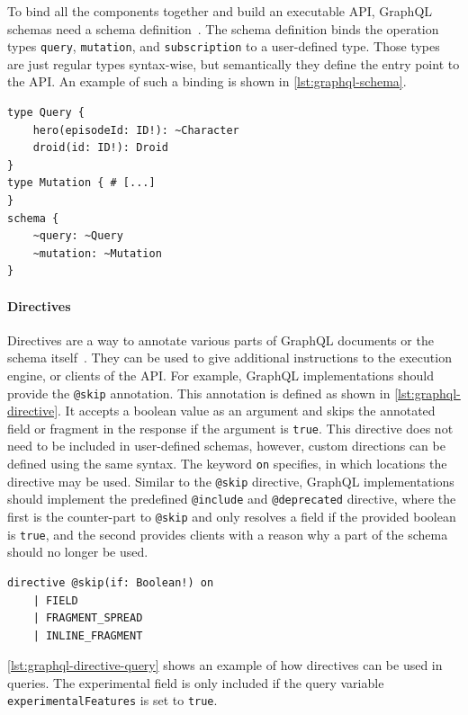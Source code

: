 To bind all the components together and build an executable \ac{API}, GraphQL schemas need a schema definition~\cite{Facebook2018}.
The schema definition binds the operation types \texttt{query}, \texttt{mutation}, and \texttt{subscription} to a user-defined type.
Those types are just regular types syntax-wise, but semantically they define the entry point to the \ac{API}.
An example of such a binding is shown in \autoref{lst:graphql-schema}.

\begin{lstlisting}[caption={Query and Mutation Types}, language=graphqls, label={lst:graphql-schema}]
type Query {
    hero(episodeId: ID!): ~Character
    droid(id: ID!): Droid
}
type Mutation { # [...]
}
schema {
    ~query: ~Query
    ~mutation: ~Mutation
}      
\end{lstlisting}

\paragraph{Directives}

Directives are a way to annotate various parts of GraphQL documents or the schema itself~\cite{Facebook2018}.
They can be used to give additional instructions to the execution engine, or clients of the \ac{API}.
For example, GraphQL implementations should provide the \texttt{@skip} annotation.
This annotation is defined as shown in \autoref{lst:graphql-directive}.
It accepts a boolean value as an argument and skips the annotated field or fragment in the response if the argument is \texttt{true}.
This directive does not need to be included in user-defined schemas, however, custom directions can be defined using the same syntax.
The keyword \texttt{on} specifies, in which locations the directive may be used.
Similar to the \texttt{@skip} directive, GraphQL implementations should implement the predefined \texttt{@include} and \texttt{@deprecated} directive, where the first is the counter-part to \texttt{@skip} and only resolves a field if the provided boolean is \texttt{true}, and the second provides clients with a reason why a part of the schema should no longer be used.


\begin{lstlisting}[caption={Definition of the \texttt{@skip} Annotation}, language=graphqls, label={lst:graphql-directive}]
directive @skip(if: Boolean!) on
    | FIELD 
    | FRAGMENT_SPREAD 
    | INLINE_FRAGMENT
\end{lstlisting}

\autoref{lst:graphql-directive-query} shows an example of how directives can be used in queries.
The experimental field is only included if the query variable \texttt{experimentalFeatures} is set to \texttt{true}.

